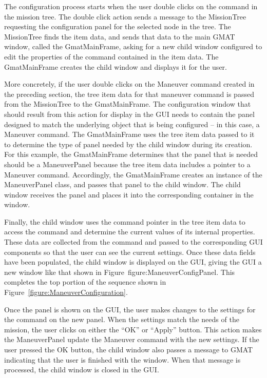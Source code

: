 The configuration process starts when the user double clicks on the command in the mission tree. 
The double click action sends a message to the MissionTree requesting the configuration panel for
the
selected node in the tree.  The MissionTree finds the item data, and sends that data to the main
GMAT window, called the GmatMainFrame, asking for a new child window configured to edit the
properties of the command contained in the item data.  The GmatMainFrame creates the child window
and displays it for the user.

More concretely, if the user double clicks on the Maneuver command created in the preceding
section, the tree item data for that maneuver command is passed from the MissionTree to the
GmatMainFrame.  The configuration window that should result from this action for display in the GUI
needs to contain the panel designed to match the underlying object that is being configured -- in
this case, a Maneuver command.  The GmatMainFrame uses the tree item data passed to it to determine
the type of panel needed by the child window during its creation. For this example, the
GmatMainFrame determines that the panel that is needed should be a ManeuverPanel because the tree
item data includes a pointer to a Maneuver command.  Accordingly, the GmatMainFrame creates an
instance of the ManeuverPanel class, and passes that panel to the child window.  The child window
receives the panel and places it into the corresponding container in the window.

Finally, the child window uses the command pointer in the tree item data to access the command and
determine the current values of its internal properties.  These data are collected from the command
and passed to the corresponding GUI components so that the user can see the current settings. Once
these data fields have been populated, the child window is displayed on the GUI, giving the GUI a
new window like that shown in Figure~{figure:ManeuverConfigPanel}.  This completes the top portion
of
the sequence shown in Figure~\ref{figure:ManeuverConfiguration}.

Once the panel is shown on the GUI, the user makes changes to the settings for the command on the
new panel.  When the settings match the needs of the mission, the user clicks on either the ``OK''
or ``Apply'' button.  This action makes the ManeuverPanel update the Maneuver command with the new
settings.  If the user pressed the OK button, the child window also passes a message to GMAT
indicating that the user is finished with the window.  When that message is processed, the child
window is closed in the GUI.

